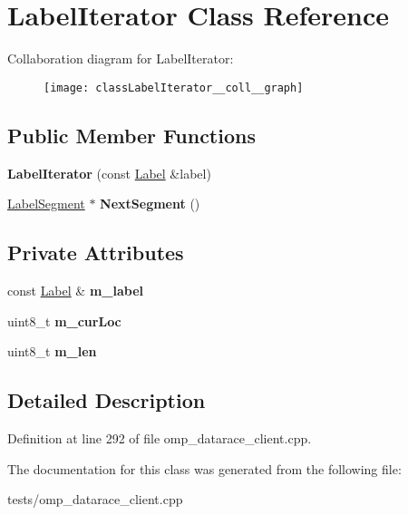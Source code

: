 \hypertarget{classLabelIterator}{\section{Label\-Iterator Class Reference}
\label{classLabelIterator}
}


Collaboration diagram for Label\-Iterator\-:
\nopagebreak
\begin{figure}[H]
\begin{center}
\leavevmode
\texttt{[image: classLabelIterator\_\_coll\_\_graph]}
\end{center}
\end{figure}
\subsection*{Public Member Functions}
\begin{DoxyCompactItemize}
\item 
\hypertarget{classLabelIterator_af370588e2997f1fa3e06efddaa2173b9}{{\bfseries Label\-Iterator} (const \hyperlink{classLabel}{Label} \&label)}\label{classLabelIterator_af370588e2997f1fa3e06efddaa2173b9}

\item 
\hypertarget{classLabelIterator_a9190853b7a574b74ee69356dc4dd6cca}{\hyperlink{structLabelSegment}{Label\-Segment} $\ast$ {\bfseries Next\-Segment} ()}\label{classLabelIterator_a9190853b7a574b74ee69356dc4dd6cca}

\end{DoxyCompactItemize}
\subsection*{Private Attributes}
\begin{DoxyCompactItemize}
\item 
\hypertarget{classLabelIterator_a3028cd8bcab7018703e165bc22df580c}{const \hyperlink{classLabel}{Label} \& {\bfseries m\-\_\-label}}\label{classLabelIterator_a3028cd8bcab7018703e165bc22df580c}

\item 
\hypertarget{classLabelIterator_a96185626cff6e9d3322b0973c438b085}{uint8\-\_\-t {\bfseries m\-\_\-cur\-Loc}}\label{classLabelIterator_a96185626cff6e9d3322b0973c438b085}

\item 
\hypertarget{classLabelIterator_adbe2a6f26ff563475cda773059034c3a}{uint8\-\_\-t {\bfseries m\-\_\-len}}\label{classLabelIterator_adbe2a6f26ff563475cda773059034c3a}

\end{DoxyCompactItemize}


\subsection{Detailed Description}


Definition at line 292 of file omp\-\_\-datarace\-\_\-client.\-cpp.



The documentation for this class was generated from the following file\-:\begin{DoxyCompactItemize}
\item 
tests/omp\-\_\-datarace\-\_\-client.\-cpp\end{DoxyCompactItemize}
